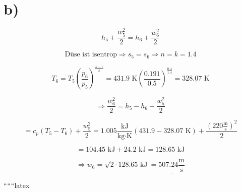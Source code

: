 

\section*{b)}

\[
h_5 + \frac{w_5^2}{2} = h_6 + \frac{w_6^2}{2}
\]

\[
\text{Düse ist isentrop} \Rightarrow s_5 = s_6 \Rightarrow n = k = 1.4
\]

\[
T_6 = T_5 \left( \frac{p_6}{p_5} \right)^{\frac{k-1}{k}} = 431.9 \text{ K} \left( \frac{0.191}{0.5} \right)^{\frac{0.4}{1.4}} = \underline{328.07 \text{ K}}
\]

\[
\Rightarrow \frac{w_6^2}{2} = h_5 - h_6 + \frac{w_5^2}{2}
\]

\[
= c_p \left( T_5 - T_6 \right) + \frac{w_5^2}{2} = 1.005 \frac{\text{kJ}}{\text{kg} \cdot \text{K}} \left( 431.9 - 328.07 \text{ K} \right) + \frac{(220 \frac{\text{m}}{\text{s}})^2}{2}
\]

\[
= 104.45 \text{ kJ} + 24.2 \text{ kJ} = 128.65 \text{ kJ}
\]

\[
\Rightarrow w_6 = \sqrt{2 \cdot 128.65 \text{ kJ}} = \underline{507.24 \frac{\text{m}}{\text{s}}}
\]

``````latex